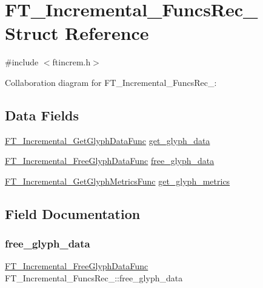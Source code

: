 \hypertarget{struct_f_t___incremental___funcs_rec__}{}\section{F\+T\+\_\+\+Incremental\+\_\+\+Funcs\+Rec\+\_\+ Struct Reference}
\label{struct_f_t___incremental___funcs_rec__}


{\ttfamily \#include $<$ftincrem.\+h$>$}



Collaboration diagram for F\+T\+\_\+\+Incremental\+\_\+\+Funcs\+Rec\+\_\+\+:
\subsection*{Data Fields}
\begin{DoxyCompactItemize}
\item 
\hyperlink{ftincrem_8h_ac6b537b5cb4b97b05cae225e24e85720}{F\+T\+\_\+\+Incremental\+\_\+\+Get\+Glyph\+Data\+Func} \hyperlink{struct_f_t___incremental___funcs_rec___ac276b7ff9624b8d8bf144ab8d00538b4}{get\+\_\+glyph\+\_\+data}
\item 
\hyperlink{ftincrem_8h_a80ee63b054c3ca6ca7cf280071853bd6}{F\+T\+\_\+\+Incremental\+\_\+\+Free\+Glyph\+Data\+Func} \hyperlink{struct_f_t___incremental___funcs_rec___a9201afcfda8c15be839aee04306dff0a}{free\+\_\+glyph\+\_\+data}
\item 
\hyperlink{ftincrem_8h_a3bd123a916bc132ec44104eab2e52a3f}{F\+T\+\_\+\+Incremental\+\_\+\+Get\+Glyph\+Metrics\+Func} \hyperlink{struct_f_t___incremental___funcs_rec___ac7d95e85357ab9d1893660b0628c1908}{get\+\_\+glyph\+\_\+metrics}
\end{DoxyCompactItemize}


\subsection{Field Documentation}
\mbox{\label{struct_f_t___incremental___funcs_rec___a9201afcfda8c15be839aee04306dff0a}} 
\subsubsection{\texorpdfstring{free\+\_\+glyph\+\_\+data}{free\_glyph\_data}}
{\footnotesize\ttfamily \hyperlink{ftincrem_8h_a80ee63b054c3ca6ca7cf280071853bd6}{F\+T\+\_\+\+Incremental\+\_\+\+Free\+Glyph\+Data\+Func} F\+T\+\_\+\+Incremental\+\_\+\+Funcs\+Rec\+\_\+\+::free\+\_\+glyph\+\_\+data}

